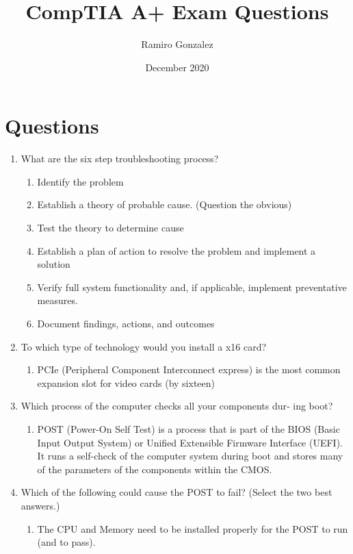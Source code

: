 \documentclass{article}
\title{CompTIA A+ Exam Questions}
\author{Ramiro Gonzalez}
\date{December 2020}
\begin{document}
\maketitle
\section{Questions} 
\begin{enumerate}
    \item What are the six step troubleshooting process? 
    \begin{enumerate}
        \item Identify the problem
        \item Establish a theory of probable cause. (Question the obvious) 
        \item Test the theory to determine cause
        \item Establish a plan of action to resolve the problem and implement a solution
        \item Verify full system functionality and, if applicable, implement preventative measures. 
        \item Document findings, actions, and outcomes 
    \end{enumerate}
    \item To which type of technology would you install a x16 card?
    \begin{enumerate}
        \item PCIe (Peripheral Component Interconnect express) is the most common expansion slot for video cards (by sixteen) 
    \end{enumerate}
    \item Which process of the computer checks all your components dur‐
ing boot?
    \begin{enumerate}
        \item POST (Power-On Self Test) is a process that is part of the BIOS (Basic Input Output System) or Unified Extensible Firmware Interface (UEFI). It runs a self-check of the computer system during boot and stores many of the parameters of the components within the CMOS. 
    \end{enumerate}
    \item Which of the following could cause the POST to fail? (Select
the two best answers.) 
    \begin{enumerate}
        \item The CPU and Memory need to be installed properly for the POST to run (and to pass). 
    \end{enumerate}
    

\end{enumerate}
\end{document}
